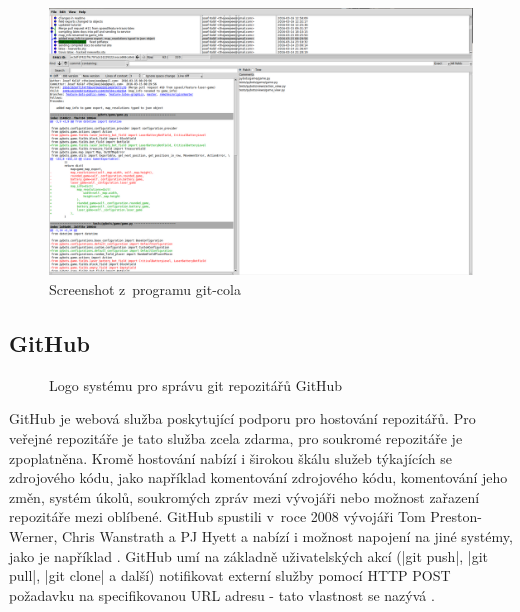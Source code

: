 \begin{figure}[bht]
	\centering
	\begin{minipage}{\textwidth}
 		\centering
 		\includegraphics[width=\textwidth]{assets/git-cola-screenshot}
 		\caption{Screenshot z~programu git-cola}
 		\label{fig:git-cola}
 	\end{minipage}
\end{figure}

\subsection{GitHub}

\begin{figure}
 	\centering
 	
 	\caption{Logo systému pro správu git repozitářů GitHub}
\end{figure}

GitHub je webová služba poskytující podporu pro hostování  repozitářů. Pro veřejné repozitáře je tato služba zcela zdarma, pro soukromé repozitáře je zpoplatněna. Kromě hostování nabízí i širokou škálu služeb týkajících se zdrojového kódu, jako například komentování zdrojového k\'{o}du, komentování jeho změn, systém úkolů, soukromých zpráv mezi vývojáři nebo možnost zařazení repozitáře mezi oblíbené. GitHub spustili v~roce 2008 vývojáři Tom Preston-Werner, Chris Wanstrath a PJ Hyett a nabízí i možnost napojení na jiné systémy, jako je například . GitHub umí na základně uživatelských akcí (\ic|git push|, \ic|git pull|, \ic|git clone| a další) notifikovat externí služby pomocí HTTP POST požadavku na specifikovanou URL adresu - tato vlastnost se nazývá .

